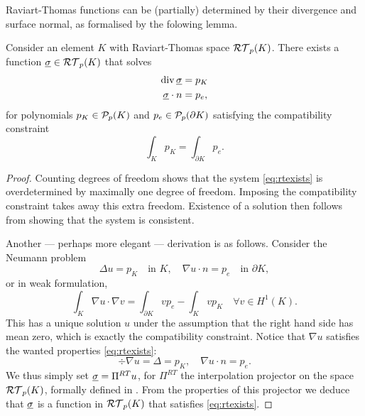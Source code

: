 \documentclass[thesis.tex]{subfiles}
\begin{document}
Raviart-Thomas functions can be (partially) determined by their divergence and surface normal, as formalised by the folowing lemma.
\begin{lem}
  \label{lem:rtexists}
  Consider an element $K$ with Raviart-Thomas space $\RT_p(K)$.
  There exists a function $\vsig \in \RT_p(K)$ that  solves
  \begin{equation}
    \label{eq:rtexists}
  \begin{aligned}
    \div\vsig &= p_K\\
    \vsig \cdot n &= p_e,
  \end{aligned}
\end{equation}
  for polynomials $p_K \in \P_p(K)$ and $p_{e} \in \P_p(\partial K)$ satisfying
  the compatibility constraint
  \[
    \int_K p_K = \int_{\partial K} p_e.
  \]
\end{lem}
\begin{proof}
  Counting degrees of freedom shows that the system \eqref{eq:rtexists} is overdetermined by maximally one degree of freedom. Imposing
  the compatibility constraint takes away this extra freedom. Existence of a solution then follows from showing that the system is consistent.

  Another --- perhaps more elegant --- derivation is as follows. Consider the Neumann problem
  \[
    \Delta u = p_K \quad \text{in } K, \quad \nabla u\cdot n = p_e \quad \text{in } \partial K,
  \]
  or in weak formulation,
  \[
    \int_K \nabla u \cdot \nabla v = \int_{\partial K} v p_e - \int_K vp_K \quad \forall v \in H^1(K).
  \]
  This has a unique solution $u$ under the assumption that the right hand side has mean zero, which is exactly the compatibility constraint.
  Notice that $\nabla u$ satisfies the wanted properties \eqref{eq:rtexists}:
  \[
    \div \nabla u = \Delta = p_K, \quad \nabla u \cdot n = p_e.
  \]
  We thus simply set $\vsig = \Pi^{RT} u$, for $\Pi^{RT}$ the interpolation projector on the space $\RT_p(K)$,
  formally defined in \cite[\S3.4]{brezzimixed}. From the properties of this projector \cite[Lem~3.7]{brezzimixed} we
  deduce that $\vsig$ is a function in $\RT_p(K)$ that satisfies \eqref{eq:rtexists}.
\end{proof}
\end{document}
